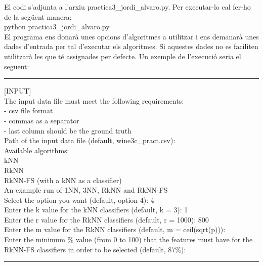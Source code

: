 \documentclass{article} %
\newcommand\tab[1][1cm]{\hspace*{#1}}
\begin{document}
{\color{blue}
	El codi s'adjunta a l'arxiu {\selectfont\small practica3\_jordi\_alvaro.py}. Per executar-lo cal fer-ho de la següent manera: \\

	{\selectfont\small python practica3\_jordi\_alvaro.py} \\

	El programa ens donarà unes opcions d'algoritmes a utilitzar i ens demanarà unes dades d'entrada per tal d'executar els algoritmes. Si aquestes dades no es faciliten utilitzarà les que té assignades per defecte. Un exemple de l'execució seria el següent: \\

	{\selectfont\small 
		\hrule
		\vspace{12pt}
		[INPUT] \\
 
		The input data file must meet the following requirements: \\
			\tab- csv file format \\
			\tab- commas as a separator \\
			\tab- last column should be the ground truth \\
		Path of the input data file (default, wine3c\_pract.csv): \\
 
		Available algorithms: \\ 
			\tab{[1]} kNN \\
			\tab{[2]} RkNN \\
			\tab{[3]} RkNN-FS (with a kNN as a classifier) \\
			\tab{[4]} An example run of 1NN, 3NN, RkNN and RkNN-FS \\
		Select the option you want (default, option 4): 4 \\
 
		Enter the k value for the kNN classifiers (default, k = 3): 1 \\
 
		Enter the r value for the RkNN classifiers (default, r = 1000): 800 \\

		Enter the m value for the RkNN classifiers (default, m = ceil(sqrt(p))): \\

		Enter the minimum \% value (from 0 to 100) that the features must have for the RkNN-FS classifiers in order to be selected (default, 87\%): \\
		\hrule
		\vspace{12pt}
	}

}
\end{document}
